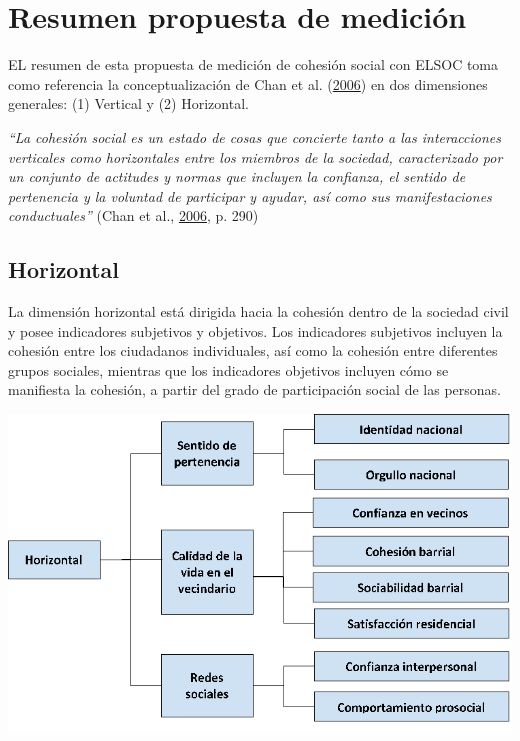 \documentclass[
  12pt,
]{book}
\begin{document}
\hypertarget{resumen-propuesta-de-mediciuxf3n}{%
\chapter{Resumen propuesta de medición}\label{resumen-propuesta-de-mediciuxf3n}}

EL resumen de esta propuesta de medición de cohesión social con ELSOC toma como referencia la conceptualización de Chan et al. (\protect\hyperlink{ref-chan_Reconsidering_2006}{2006}) en dos dimensiones generales: (1) Vertical y (2) Horizontal.

\emph{``La cohesión social es un estado de cosas que concierte tanto a las interacciones verticales como horizontales entre los miembros de la sociedad, caracterizado por un conjunto de actitudes y normas que incluyen la confianza, el sentido de pertenencia y la voluntad de participar y ayudar, así como sus manifestaciones conductuales''} (Chan et al., \protect\hyperlink{ref-chan_Reconsidering_2006}{2006}, p. 290)

\hypertarget{horizontal}{%
\section{Horizontal}\label{horizontal}}

La dimensión horizontal está dirigida hacia la cohesión dentro de la sociedad civil y posee indicadores subjetivos y objetivos. Los indicadores subjetivos incluyen la cohesión entre los ciudadanos individuales, así como la cohesión entre diferentes grupos sociales, mientras que los indicadores objetivos incluyen cómo se manifiesta la cohesión, a partir del grado de participación social de las personas.

\includegraphics{inputs/images/horizontal.png}
\end{document}
